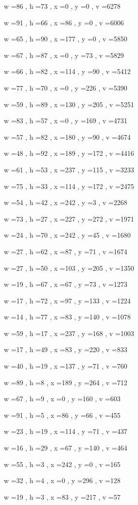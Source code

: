 \documentclass[11pt]{article}
\begin{document}
w =86 , h =73 , x =0 , y =0 , v =6278
\par
w =91 , h =66 , x =86 , y =0 , v =6006
\par
w =65 , h =90 , x =177 , y =0 , v =5850
\par
w =67 , h =87 , x =0 , y =73 , v =5829
\par
w =66 , h =82 , x =114 , y =90 , v =5412
\par
w =77 , h =70 , x =0 , y =226 , v =5390
\par
w =59 , h =89 , x =130 , y =205 , v =5251
\par
w =83 , h =57 , x =0 , y =169 , v =4731
\par
w =57 , h =82 , x =180 , y =90 , v =4674
\par
w =48 , h =92 , x =189 , y =172 , v =4416
\par
w =61 , h =53 , x =237 , y =115 , v =3233
\par
w =75 , h =33 , x =114 , y =172 , v =2475
\par
w =54 , h =42 , x =242 , y =3 , v =2268
\par
w =73 , h =27 , x =227 , y =272 , v =1971
\par
w =24 , h =70 , x =242 , y =45 , v =1680
\par
w =27 , h =62 , x =87 , y =71 , v =1674
\par
w =27 , h =50 , x =103 , y =205 , v =1350
\par
w =19 , h =67 , x =67 , y =73 , v =1273
\par
w =17 , h =72 , x =97 , y =133 , v =1224
\par
w =14 , h =77 , x =83 , y =140 , v =1078
\par
w =59 , h =17 , x =237 , y =168 , v =1003
\par
w =17 , h =49 , x =83 , y =220 , v =833
\par
w =40 , h =19 , x =137 , y =71 , v =760
\par
w =89 , h =8 , x =189 , y =264 , v =712
\par
w =67 , h =9 , x =0 , y =160 , v =603
\par
w =91 , h =5 , x =86 , y =66 , v =455
\par
w =23 , h =19 , x =114 , y =71 , v =437
\par
w =16 , h =29 , x =67 , y =140 , v =464
\par
w =55 , h =3 , x =242 , y =0 , v =165
\par
w =32 , h =4 , x =0 , y =296 , v =128
\par
w =19 , h =3 , x =83 , y =217 , v =57
\par
\newpage
\end{document}

